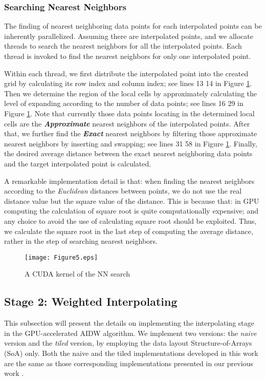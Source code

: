 \documentclass[final,5p,times,twocolumn,authoryear]{elsarticle}
\begin{document}
			\subsubsection{Searching Nearest Neighbors}
			
			The finding of  nearest neighboring data points for each interpolated points 
			can be inherently parallelized. Assuming there are  interpolated points, and 
			we allocate  threads to search the nearest neighbors for all the 
			interpolated points. Each thread is invoked to find the nearest neighbors 
			for only one interpolated point. 
			
			Within each thread, we first distribute the interpolated point into the 
			created grid by calculating its row index and column index; see lines 13 
			 14 in Figure \ref{fig5}. Then we determine the region of the local cells by 
			approximately calculating the level of expanding according to the number of 
			data points; see lines 16  29 in Figure \ref{fig5}. Note that currently those 
			data points locating in the determined local cells are the 
			\textbf{\textit{Approximate}} nearest neighbors of the interpolated points. 
			After that, we further find the \textbf{\textit{Exact}} nearest neighbors by 
			filtering those approximate nearest neighbors by inserting and swapping; see 
			lines 31  58 in Figure \ref{fig5}. Finally, the desired average distance 
			between the exact nearest neighboring data points and the target 
			interpolated point is calculated. 
			
			A remarkable implementation detail is that: when finding the nearest 
			neighbors according to the \textit{Euclidean} distances between points, we do not use the real 
			distance value but the square value of the distance. This is because that: 
			in GPU computing the calculation of square root is quite computationally 
			expensive; and any choice to avoid the use of calculating square root should 
			be exploited. Thus, we calculate the square root in the last step of 
			computing the average distance, rather in the step of searching nearest 
			neighbors.

			\begin{figure}[!h]
				\centering
				\texttt{[image: Figure5.eps]}
				\caption{A CUDA kernel of the NN search}
				\label{fig5}
			\end{figure}	

			
			\subsection{Stage 2: Weighted Interpolating}
			This subsection will present the details on implementing the interpolating 
			stage in the GPU-accelerated AIDW algorithm. We implement two versions: the 
			\textit{naive} version and the \textit{tiled} version, by employing the data layout Structure-of-Arrays 
			(SoA) only. Both the naive and the tiled implementations developed in this 
			work are the same as those corresponding implementations presented in our 
			previous work \citep{29DBLP:journals/corr/MeiXX15}.
			
\end{document}
